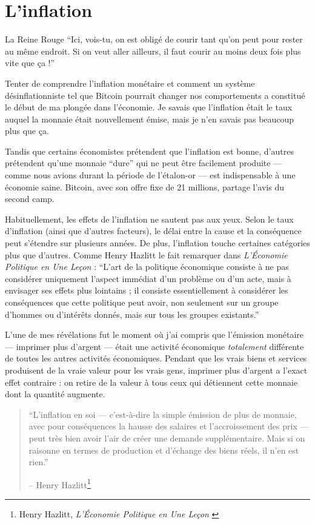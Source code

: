 \chapter{L'inflation}
\label{les:9}

\begin{chapquote}{La Reine Rouge} 
\enquote{Ici, vois-tu, on est obligé de courir tant qu'on peut pour rester au
même endroit. Si on veut aller ailleurs, il faut courir au moins deux fois plus
vite que ça !}
\end{chapquote}

Tenter de comprendre l'inflation monétaire et comment un système
désinflationniste tel que Bitcoin pourrait changer nos comportements a constitué
le début de ma plongée dans l'économie. Je savais que l'inflation était le taux
auquel la monnaie était nouvellement émise, mais je n'en savais pas beaucoup
plus que ça.

Tandis que certains économistes prétendent que l'inflation est bonne, d'autres
prétendent qu'une monnaie \enquote{dure} qui ne peut être facilement produite
--- comme nous avions durant la période de l'étalon-or --- est indispensable à
une économie saine. Bitcoin, avec son offre fixe de 21 millions, partage l'avis
du second camp.

Habituellement, les effets de l'inflation ne sautent pas aux yeux. Selon le taux
d'inflation (ainsi que d'autres facteurs), le délai entre la cause et la
conséquence peut s'étendre sur plusieurs années. De plus, l'inflation touche
certaines catégories plus que d'autres. Comme Henry Hazlitt le fait remarquer
dans \textit{L'Économie Politique en Une Leçon} : \enquote{L'art de la politique
économique consiste à ne pas considérer uniquement l'aspect immédiat d'un
problème ou d'un acte, mais à envisager ses effets plus lointains ; il consiste
essentiellement à considérer les conséquences que cette politique peut avoir,
non seulement sur un groupe d'hommes ou d'intérêts donnés, mais sur tous les
groupes existants.}

L'une de mes révélations fut le moment où j'ai compris que l'émission monétaire
--- imprimer plus d'argent --- était une activité économique \textit{totalement}
différente de toutes les autres activités économiques. Pendant que les vrais
biens et services produisent de la vraie valeur pour les vrais gens, imprimer
plus d'argent a l'exact effet contraire : on retire de la valeur à tous ceux
qui détiennent cette monnaie dont la quantité augmente.

\begin{quotation}\begin{samepage}
\enquote{L'inflation en soi --- c'est-à-dire la simple émission de plus de
monnaie, avec pour conséquences la hausse des salaires et l'accroissement des
prix --- peut très bien avoir l'air de créer une demande supplémentaire. Mais si
on raisonne en termes de production et d'échange des biens réels, il n'en est
rien.}
\begin{flushright} -- Henry Hazlitt\footnote{Henry Hazlitt, \textit{L'Économie
Politique en Une Leçon} \cite{hazlitt}}
\end{flushright}\end{samepage}\end{quotation}

